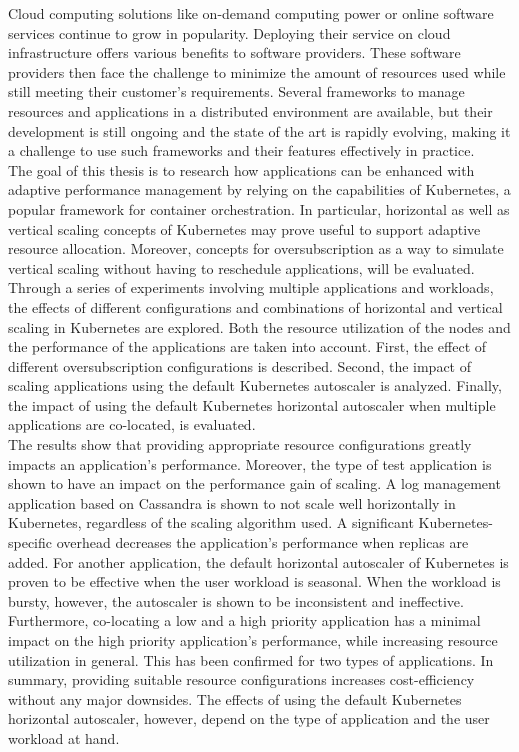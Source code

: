 \documentclass[../main.tex]{subfiles}
\begin{document}
    Cloud computing solutions like on-demand computing power or online software services continue to grow in popularity. Deploying their service on cloud infrastructure offers various benefits to software providers. These software providers then face the challenge to minimize the amount of resources used while still meeting their customer's requirements. Several frameworks to manage resources and applications in a distributed environment are available, but their development is still ongoing and the state of the art is rapidly evolving, making it a challenge to use such frameworks and their features effectively in practice.\\
    
    The goal of this thesis is to research how applications can be enhanced with adaptive performance management by relying on the capabilities of Kubernetes, a popular framework for container orchestration. In particular, horizontal as well as vertical scaling concepts of Kubernetes may prove useful to support adaptive resource allocation. Moreover, concepts for oversubscription as a way to simulate vertical scaling without having to reschedule applications, will be evaluated.\\
    
    Through a series of experiments involving multiple applications and workloads, the effects of different configurations and combinations of horizontal and vertical scaling in Kubernetes are explored. Both the resource utilization of the nodes and the performance of the applications are taken into account. First, the effect of different oversubscription configurations is described. Second, the impact of scaling applications using the default Kubernetes autoscaler is analyzed. Finally, the impact of using the default Kubernetes horizontal autoscaler when multiple applications are co-located, is evaluated. \\
    
    The results show that providing appropriate resource configurations greatly impacts an application's performance. Moreover, the type of test application is shown to have an impact on the performance gain of scaling. A log management application based on Cassandra is shown to not scale well horizontally in Kubernetes, regardless of the scaling algorithm used. A significant Kubernetes-specific overhead decreases the application's performance when replicas are added. For another application, the default horizontal autoscaler of Kubernetes is proven to be effective when the user workload is seasonal. When the workload is bursty, however, the autoscaler is shown to be inconsistent and ineffective. Furthermore, co-locating a low and a high priority application has a minimal impact on the high priority application's performance, while increasing resource utilization in general. This has been confirmed for two types of applications. In summary, providing suitable resource configurations increases cost-efficiency without any major downsides. The effects of using the default Kubernetes horizontal autoscaler, however, depend on the type of application and the user workload at hand.
    
    
    
\end{document}
